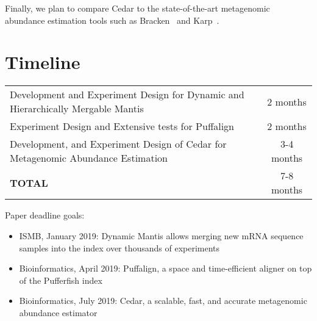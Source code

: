 Finally, we plan to compare Cedar to the state-of-the-art metagenomic abundance estimation tools
such as Bracken~\cite{lu2017bracken} and Karp~\cite{reppell2018using}.


\chapter{Timeline}

\renewcommand{\arraystretch}{2.0}
\begin{center}
    \begin{tabularx}{\linewidth}{|X|c|}
        \hline
        Development and Experiment Design for Dynamic and Hierarchically Mergable Mantis & 2 months \\
        Experiment Design and Extensive tests for Puffalign & 2 months \\
        Development, and Experiment Design of Cedar for Metagenomic Abundance Estimation & 3-4 months \\
        \hline
        \textbf{TOTAL} & 7-8 months \\
        \hline
    \end{tabularx}

\end{center}


Paper deadline goals:

\begin{itemize}
    \item ISMB, January 2019: Dynamic Mantis allows merging new mRNA sequence samples into the index over
    thousands of experiments
    \item Bioinformatics, April 2019: Puffalign, a space and time-efficient aligner on top of the Pufferfish index
    \item Bioinformatics, July 2019: Cedar, a scalable, fast, and accurate metagenomic abundance estimator
\end{itemize}

